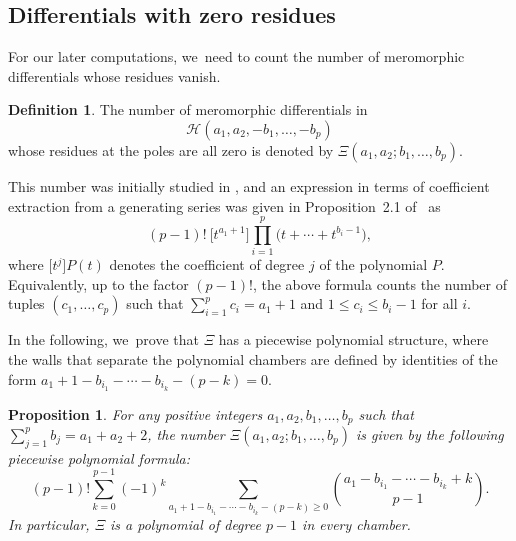 \documentclass[11pt]{article}
\newcommand\calH{{\mathcal H}}
\newtheorem{prop}[thm]{Proposition}
\theoremstyle{definition}
\newtheorem{defn}[thm]{Definition}
\begin{document}
\subsection{Differentials with zero residues}\label{sub:counting}

For our later computations, we~need to count the number of meromorphic differentials whose residues vanish.
\begin{defn}\label{def:residuless}
The number of meromorphic differentials in
\[
\calH(a_{1},a_{2},-b_{1},\dots,-b_{p})
\]
whose residues at the poles are all zero is denoted by $\Xi(a_{1},a_{2};b_{1},\dots,b_{p})$.
\end{defn}
This number was initially studied in \cite{EMZ}, and an expression in terms of coefficient extraction from a generating series was given in Proposition~2.1 of \cite{CMSZ}~as
\[
(p-1)!\ \big[t^{a_1+1}\big]\prod_{i=1}^p \big(t + \cdots + t^{b_i-1}\big),
\]
where $\big[t^{j}\big]P(t)$ denotes the coefficient of degree $j$ of the polynomial $P$.
Equivalently, up to the factor $(p-1)!$, the above formula
counts the number of tuples $(c_1, \ldots, c_p)$ such that
$\sum_{i=1}^p c_i = a_1 + 1$ and $1\leq c_i\leq b_i-1$ for all $i$.

In the following, we~prove that $\Xi$ has a piecewise polynomial structure, where the walls that separate the polynomial chambers are defined by identities of the form $a_1+1-b_{i_1}-\cdots -b_{i_k}-(p-k)= 0$.

\begin{prop}\label{prop:residueless}
For any positive integers $a_{1},a_{2},b_{1},\dots,b_{p}$ such that $\sum_{j=1}^p b_j = a_{1}+a_{2}+2$, the number $\Xi(a_{1},a_{2};b_{1},\dots,b_{p})$ is given by the following piecewise polynomial formula:
\begin{equation}
\label{eqn:residueless}
(p-1)!\sum_{k=0}^{p-1} (-1)^k \sum_{a_1+1-b_{i_1}-\cdots -b_{i_k}-(p-k)\geq 0} \binom{a_1-b_{i_1}-\cdots-b_{i_k}+k}{p-1}.
\end{equation}
In particular, $\Xi$ is a polynomial of degree $p-1$ in every chamber.
\end{prop}
\end{document}
